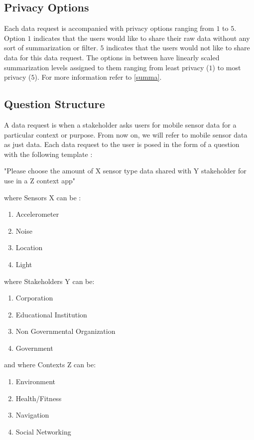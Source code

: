 \subsection{Privacy Options} \label{options}
Each data request is accompanied with privacy options ranging from $1$ to $5$. Option $1$ indicates that the users would like to
share their raw data without any sort of summarization or filter. $5$ indicates that the users would not like to share data for this data request.
The options in between have linearly scaled summarization levels assigned to them ranging from least privacy ($1$) to most privacy ($5$). For more information refer to \ref{summa}.

\subsection{Question Structure}

A data request is when a stakeholder asks users for mobile sensor data for a particular context or purpose. From now on, we will refer to mobile sensor data as just data. Each data request to the user is posed in the form of a question with the following template :

 "Please choose the amount of X sensor type data shared with Y stakeholder for use in a Z context app"

where Sensors X can be :
\begin{enumerate}
    \item Accelerometer
    \item Noise
    \item Location
    \item Light
\end{enumerate}
where Stakeholders Y can be:
\begin{enumerate}
    \item Corporation
    \item Educational Institution
    \item Non Governmental Organization
    \item Government
\end{enumerate}
and where Contexts Z can be:
\begin{enumerate}
    \item Environment
    \item Health/Fitness
    \item Navigation
    \item Social Networking
\end{enumerate}

